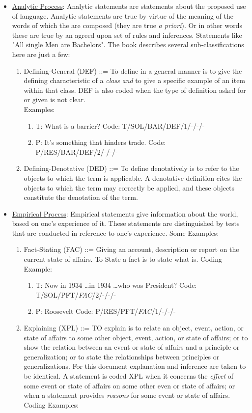 \documentclass[10pt, letterpaper]{article}
\begin{document}
\begin{itemize}
\begin{itemize}
\item \uline{Analytic Process}:  Analytic statements are statements about the proposed use of language. Analytic statements are true by virtue of the meaning of the words of which the are composed (they are true \emph{a priori}). Or in other words these are true by an agreed upon set of rules and inferences. Statements like "All single Men are Bachelors". The book describes several sub-classifications here are just a few:
\begin{enumerate}
\item Defining-General (DEF) ::= To define in a general manner is to give the defining characteristic of a \emph{class} \emph{and} to give a specific example of an item within that class. DEF is also coded when the type of definition asked for or given is not clear. \\
Examples:
\begin{enumerate}
\item T: What is a barrier? Code: T/SOL/BAR/DEF/1/-/-/-
\item P: It's something that hinders trade. Code: P/RES/BAR/DEF/2/-/-/-
\end{enumerate}
\item Defining-Denotative (DED) ::= To define denotatively is to refer to the objects to which the term is applicable. A denotative definition cites the objects to which the term may correctly be applied, and these objects constitute the denotation of the term.
\end{enumerate}
\item \uline{Empirical Process}: Empirical statements give information about the world, based on one's experience of it. These statements are distinguished by tests that are conducted in reference to one's experience. Some Examples:
\begin{enumerate}
\item Fact-Stating (FAC) ::= Giving an account, description or report on the current state of affairs. To State a fact is to state what is. Coding Example:
\begin{enumerate}
\item T: Now in 1934 \ldots in 1934 \ldots who was President? Code: T/SOL/PFT/\textit{FAC}/2/-/-/-
\item P: Roosevelt Code: P/RES/PFT/\textit{FAC}/1/-/-/-
\end{enumerate}
\item Explaining (XPL) ::= TO explain is to relate an object, event, action, or state of affairs to some other object, event, action, or state of affairs; or to show the relation between an event or state of affairs and a principle or generalization; or to state the relationships between principles or generalizations. For this document explanation and inference are taken to be identical. A statement is coded XPL when it concerns the \emph{effect} of some event or state of affairs on some other even or state of affairs; or when a statement provides \emph{reasons} for some event or state of affairs. Coding Examples:

\end{enumerate}
\end{itemize}
\end{itemize}
\end{document}
